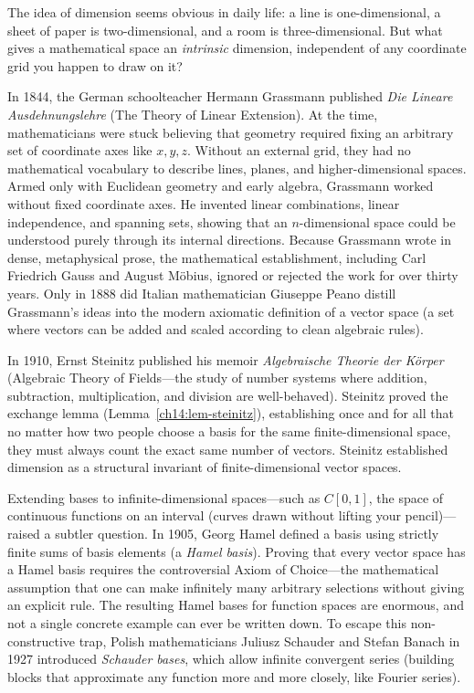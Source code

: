 \begin{historybox}
The idea of dimension seems obvious in daily life: a line is one-dimensional, a sheet of paper is two-dimensional, and a room is three-dimensional. But what gives a mathematical space an \emph{intrinsic} dimension, independent of any coordinate grid you happen to draw on it?

In 1844, the German schoolteacher Hermann Grassmann published \emph{Die Lineare Ausdehnungslehre} (The Theory of Linear Extension). At the time, mathematicians were stuck believing that geometry required fixing an arbitrary set of coordinate axes like $x, y, z$. Without an external grid, they had no mathematical vocabulary to describe lines, planes, and higher-dimensional spaces. Armed only with Euclidean geometry and early algebra, Grassmann worked without fixed coordinate axes. He invented linear combinations, linear independence, and spanning sets, showing that an $n$-dimensional space could be understood purely through its internal directions. Because Grassmann wrote in dense, metaphysical prose, the mathematical establishment, including Carl Friedrich Gauss and August Möbius, ignored or rejected the work for over thirty years. Only in 1888 did Italian mathematician Giuseppe Peano distill Grassmann's ideas into the modern axiomatic definition of a vector space (a set where vectors can be added and scaled according to clean algebraic rules).

In 1910, Ernst Steinitz published his memoir \emph{Algebraische Theorie der Körper} (Algebraic Theory of Fields---the study of number systems where addition, subtraction, multiplication, and division are well-behaved). Steinitz proved the exchange lemma (Lemma~\ref{ch14:lem-steinitz}), establishing once and for all that no matter how two people choose a basis for the same finite-dimensional space, they must always count the exact same number of vectors. Steinitz established dimension as a structural invariant of finite-dimensional vector spaces.

Extending bases to infinite-dimensional spaces---such as $C[0,1]$, the space of continuous functions on an interval (curves drawn without lifting your pencil)---raised a subtler question. In 1905, Georg Hamel defined a basis using strictly finite sums of basis elements (a \emph{Hamel basis}). Proving that every vector space has a Hamel basis requires the controversial Axiom of Choice---the mathematical assumption that one can make infinitely many arbitrary selections without giving an explicit rule. The resulting Hamel bases for function spaces are enormous, and not a single concrete example can ever be written down. To escape this non-constructive trap, Polish mathematicians Juliusz Schauder and Stefan Banach in 1927 introduced \emph{Schauder bases}, which allow infinite convergent series (building blocks that approximate any function more and more closely, like Fourier series).


\end{historybox}
